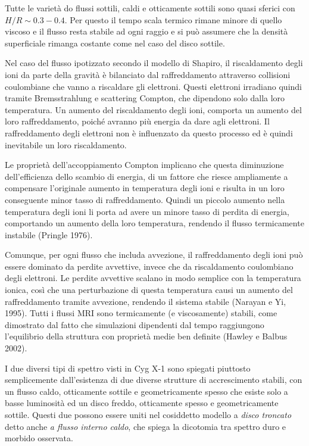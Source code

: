 \documentclass[a4paperbi]{article}
\begin{document}
	Tutte le varietà do flussi sottili, caldi e otticamente sottili sono quasi sferici con $H/R\sim0.3-0.4$. Per questo il tempo scala termico rimane minore di quello viscoso e il flusso resta stabile ad ogni raggio e si può assumere che la densità superficiale rimanga costante come nel caso del disco sottile.
	
	Nel caso del flusso ipotizzato secondo il modello di Shapiro, il riscaldamento degli ioni da parte della gravità è bilanciato dal raffreddamento attraverso collisioni coulombiane che vanno a riscaldare gli elettroni. Questi elettroni irradiano quindi tramite Bremsstrahlung e scattering Compton, che dipendono solo dalla loro temperatura. Un aumento del riscaldamento degli ioni, comporta un aumento del loro raffreddamento, poiché avranno più energia da dare agli elettroni. Il raffreddamento degli elettroni non è influenzato da questo processo ed è quindi inevitabile un loro riscaldamento. 
	
	Le proprietà dell'accoppiamento Compton implicano che questa diminuzione dell'efficienza dello scambio di energia, di un fattore che riesce ampliamente a compensare l'originale aumento in temperatura degli ioni e risulta in un loro conseguente minor tasso di raffreddamento. Quindi un piccolo aumento nella temperatura degli ioni li porta ad avere un minore tasso di perdita di energia, comportando un aumento della loro temperatura, rendendo il flusso termicamente instabile (Pringle 1976).
	
	Comunque, per ogni flusso che includa avvezione, il raffreddamento degli ioni può essere dominato da perdite avvettive, invece che da riscaldamento coulombiano degli elettroni. Le perdite avvettive scalano in modo semplice con la temperatura ionica, così che una perturbazione di questa temperatura causi un aumento del raffreddamento tramite avvezione, rendendo il sistema stabile (Narayan e Yi, 1995). Tutti i flussi MRI sono termicamente  (e viscosamente) stabili, come dimostrato dal fatto che simulazioni dipendenti dal tempo raggiungono l'equilibrio della struttura con proprietà medie ben definite (Hawley e Balbus 2002).
	
I due diversi tipi di spettro visti in Cyg X-1 sono spiegati piuttosto semplicemente dall'esistenza di due diverse strutture di accrescimento stabili, con un flusso caldo, otticamente sottile e geometricamente spesso che esiste solo a basse luminosità ed un disco freddo, otticamente spesso e geometricamente sottile. Questi due possono essere uniti nel cosiddetto modello a \textit{disco troncato} detto anche \textit{a flusso interno caldo}, che spiega la dicotomia tra spettro duro e morbido osservata.
\end{document}
